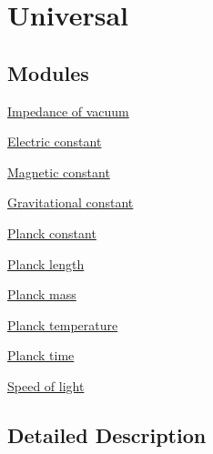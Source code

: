 \hypertarget{group___n_i_s_t_const-_universal}{}\section{Universal}
\label{group___n_i_s_t_const-_universal}
\subsection*{Modules}
\begin{DoxyCompactItemize}
\item 
\hyperlink{group___n_i_s_t_const-_impedance_of_vacuum}{Impedance of vacuum}
\item 
\hyperlink{group___n_i_s_t_const-_electric_constant}{Electric constant}
\item 
\hyperlink{group___n_i_s_t_const-_magnetic_constant}{Magnetic constant}
\item 
\hyperlink{group___n_i_s_t_const-_gravitational_constant}{Gravitational constant}
\item 
\hyperlink{group___n_i_s_t_const-_planck_constant}{Planck constant}
\item 
\hyperlink{group___n_i_s_t_const-_planck_length}{Planck length}
\item 
\hyperlink{group___n_i_s_t_const-_planck_mass}{Planck mass}
\item 
\hyperlink{group___n_i_s_t_const-_planck_temperature}{Planck temperature}
\item 
\hyperlink{group___n_i_s_t_const-_planck_time}{Planck time}
\item 
\hyperlink{group___n_i_s_t_const-_speed_of_light}{Speed of light}
\end{DoxyCompactItemize}


\subsection{Detailed Description}
